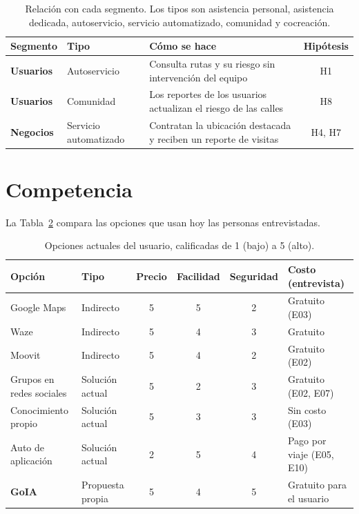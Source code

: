 \documentclass[11pt]{article}
\begin{document}
\begin{table}[H]
  \caption{Relación con cada segmento. Los tipos son asistencia personal, asistencia dedicada,
    autoservicio, servicio automatizado, comunidad y cocreación.}
  \label{tab:relacion}
  \footnotesize
  \renewcommand{\arraystretch}{1.2}
  \begin{tabularx}{\textwidth}{@{}>{\bfseries}p{}p{}Xc@{}}
    \toprule
    Segmento & Tipo & Cómo se hace & Hipótesis \\
    \midrule
    Usuarios & Autoservicio & Consulta rutas y su riesgo sin intervención del equipo & H1 \\
    Usuarios & Comunidad & Los reportes de los usuarios actualizan el riesgo de las calles & H8 \\
    Negocios & Servicio automatizado & Contratan la ubicación destacada y reciben un reporte de visitas & H4, H7 \\
    \bottomrule
  \end{tabularx}
\end{table}


\section{Competencia}
\label{sec:competencia}

La Tabla~\ref{tab:competencia} compara las opciones que usan hoy las personas entrevistadas.

\begin{table}[H]
  \caption{Opciones actuales del usuario, calificadas de 1 (bajo) a 5 (alto).}
  \label{tab:competencia}
  \footnotesize
  \renewcommand{\arraystretch}{1.2}
  \begin{tabularx}{\textwidth}{@{}p{}lcccX@{}}
    \toprule
    Opción & Tipo & Precio & Facilidad & Seguridad & Costo (entrevista) \\
    \midrule
    Google Maps & Indirecto & 5 & 5 & 2 & Gratuito (E03) \\
    Waze & Indirecto & 5 & 4 & 3 & Gratuito \\
    Moovit & Indirecto & 5 & 4 & 2 & Gratuito (E02) \\
    Grupos en redes sociales & Solución actual & 5 & 2 & 3 & Gratuito (E02, E07) \\
    Conocimiento propio & Solución actual & 5 & 3 & 3 & Sin costo (E03) \\
    Auto de aplicación & Solución actual & 2 & 5 & 4 & Pago por viaje (E05, E10) \\
    \textbf{GoIA} & Propuesta propia & 5 & 4 & 5 & Gratuito para el usuario \\
    \bottomrule
  \end{tabularx}
\end{table}
\end{document}
